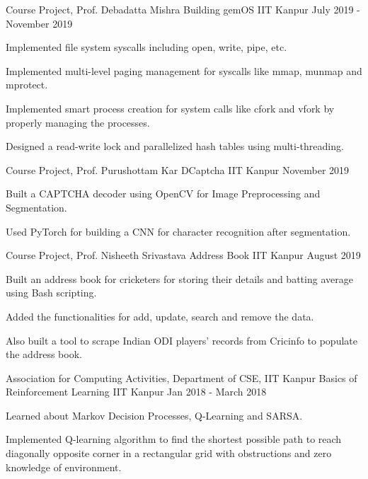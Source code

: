 \begin{cventries}
    
    \cventry
    {Course Project, Prof. Debadatta Mishra}
    {Building gemOS}
    {IIT Kanpur}
    {July 2019 - November 2019}
    {
      \begin{cvitems}
        \item {Implemented file system syscalls including open, write, pipe, etc.}
        \item {Implemented multi-level paging management for syscalls like mmap, munmap and mprotect.}
        \item {Implemented smart process creation for system calls like cfork and vfork by properly managing the processes.}
        \item {Designed a read-write lock and parallelized hash tables using multi-threading.}
      \end{cvitems}
    } 
    
    \cventry
    {Course Project, Prof. Purushottam Kar}
    {DCaptcha}
    {IIT Kanpur}
    {November 2019}
    {
      \begin{cvitems}
        \item {Built a CAPTCHA decoder using OpenCV for Image Preprocessing and Segmentation.}
        \item {Used PyTorch for building a CNN for character recognition after segmentation.}
      \end{cvitems}
    }
    
    \cventry
    {Course Project, Prof. Nisheeth Srivastava}
    {Address Book}
    {IIT Kanpur}
    {August 2019}
    {
      \begin{cvitems}
        \item {Built an address book for cricketers for storing their details and batting average using Bash scripting.}
        \item {Added the functionalities for add, update, search and remove the data.}
        \item{Also built a tool to scrape Indian ODI players' records from Cricinfo to populate the address book.}
      \end{cvitems}
    } 
    
    \cventry
    {Association for Computing Activities, Department of CSE, IIT Kanpur}
    {Basics of Reinforcement Learning}
    {IIT Kanpur}
    {Jan 2018 - March 2018}
    {
      \begin{cvitems}
        \item {Learned about Markov Decision Processes, Q-Learning and SARSA.}
        \item {Implemented Q-learning algorithm to find the shortest possible path to reach diagonally opposite corner in a rectangular grid with obstructions and zero knowledge of environment. }
      \end{cvitems}
    } 
  
\end{cventries}
